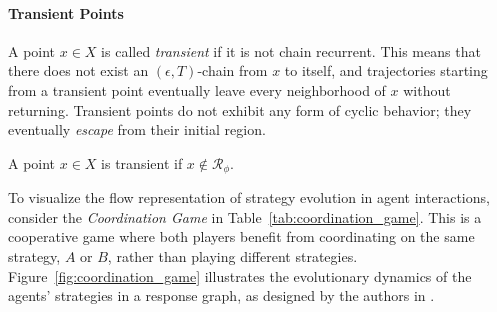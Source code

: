         \paragraph{Transient Points}

            A point $x \in X$ is called \emph{transient} if it is not chain recurrent. This means that there does not exist an $(\epsilon, T)$-chain from $x$ to itself, and trajectories starting from a transient point eventually leave every neighborhood of $x$ without returning. Transient points do not exhibit any form of cyclic behavior; they eventually \emph{escape} from their initial region.
        
            \begin{definition}
                A point $x \in X$ is transient if $x \notin \mathcal{R}_\phi$.
            \end{definition}

        \noindent
        To visualize the flow representation of strategy evolution in agent interactions, consider the \emph{Coordination Game} in Table~\ref{tab:coordination_game}. This is a cooperative game where both players benefit from coordinating on the same strategy, $A$ or $B$, rather than playing different strategies. Figure~\ref{fig:coordination_game} illustrates the evolutionary dynamics of the agents' strategies in a response graph, as designed by the authors in \cite{omidshafiei2019alpharank}.\tinydouble

